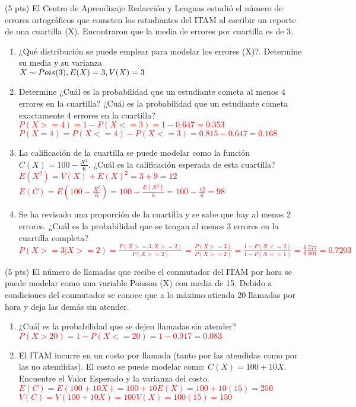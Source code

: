 \documentclass[addpoints]{exam}
\theoremstyle{mytheor}
\begin{document}
  \begin{questions}
  
  \question (5 pts) El Centro de Aprendizaje Redacción y Lenguas estudió el número de errores ortográficos que cometen los estudiantes del ITAM al escribir un reporte de una cuartilla (X). Encontraron que la media de errores por cuartilla es de 3. 
  \begin{enumerate}
  \item ¿Qué distribución se puede emplear para modelar los errores (X)?. Determine su media y su varianza\\
  \textcolor{red}{$X \sim Pois(3), \\ E(X) = 3, \\ V(X) = 3$}
  \item Determine ¿Cuál es la probabilidad que un estudiante cometa al menos 4 errores en la cuartilla? ¿Cuál es la probabilidad que un estudiante cometa exactamente 4 errores en la cuartilla? \\
  \textcolor{red}{$P(X >= 4) =  1-P(X <= 3) = 1- 0.647 = 0.353$} \\
  \textcolor{red}{$P(X = 4) =  P(X <= 4)-P(X <= 3) = 0.815 - 0.647 = 0.168$}
  \item La calificación de la cuartilla se puede modelar como la función $C(X)=100-\frac{X^2}{6}$. ¿Cuál es la calificación esperada de esta cuartilla? \\
  \textcolor{red}{$E(X^2) = V(X)+E(X)^2 = 3 + 9 = 12$} \\
  \textcolor{red}{$E(C) = E(100-\frac{X^2}{6}) = 100-\frac{E(X^2)}{6} = 100 - \frac{12}{6} = 98$}

  \item Se ha revisado una proporción de la cuartilla y se sabe que hay al menos 2 errores. ¿Cuál es la probabilidad que se tengan al menos 3 errores en la cuartilla completa? \\
  \textcolor{red}{$P(X >= 3 | X >= 2 ) = \frac{P(X >= 3,X >= 2 )}{P(X >= 2)} = \frac{P(X >= 3)}{P(X>=2)} = \frac{1-P(X<=2)}{1-P(X<=1)} = \frac{0.577}{0.801} = 0.7203$}
  
  \end{enumerate}
  
    \question (5 pts) El número de llamadas que recibe el conmutador del ITAM por hora se puede modelar como una variable Poisson (X) con media de 15. Debido a condiciones del conmutador se conoce que a lo máximo atienda 20 llamadas por hora y deja las demás sin atender. 

  \begin{enumerate}
  \item ¿Cuál es la probabilidad que se dejen llamadas sin atender? \\
  \textcolor{red}{$P(X > 20) = 1- P(X<= 20) = 1-0.917 = 0.083$}
  \item El ITAM incurre en un costo por llamada (tanto por las atendidas como por las no atendidas). El costo se puede modelar como: $C(X) = 100+10X$. Encuentre el Valor Esperado y la varianza del costo. \\
  \textcolor{red}{$E(C) = E(100+10X) = 100+10E(X) = 100+10(15) = 250$} \\
  \textcolor{red}{$V(C) = V(100+10X) = 100V(X) = 100(15) = 150$}
  

\end{enumerate}
\end{questions}
\end{document}
